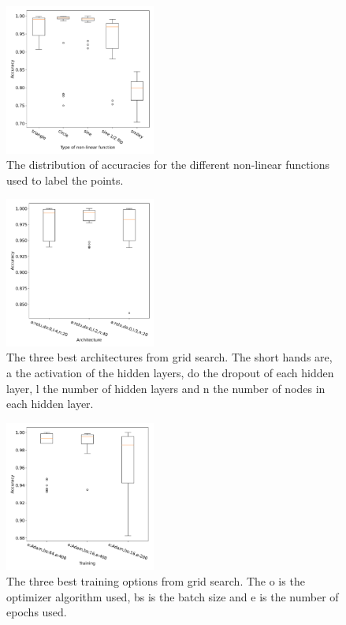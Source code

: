 \documentclass[prl,twocolumn]{revtex4-1}
\begin{document}
\begin{figure}[!tb]
  \includegraphics[width=0.44\textwidth]{task_1/figures/types_box_30.pdf}
  \caption{
  The distribution of accuracies for the different non-linear functions used to label the points. 
  }
  \label{fig:rescale_box}
\end{figure}

\begin{figure}[!tb]
  \includegraphics[width=0.44\textwidth]{task_1/figures/architecture_box_30.pdf}
  \caption{
  The three best architectures from grid search. The short hands are, a the activation of the hidden layers, do the dropout of each hidden layer, l the number of hidden layers and n the number of nodes in each hidden layer. 
  }
  \label{fig:architecture_gs_box}
\end{figure}

\begin{figure}[!tb]
  \includegraphics[width=0.44\textwidth]{task_1/figures/training_box_30.pdf}
  \caption{
  The three best training options from grid search. The o is the optimizer algorithm used, bs is the batch size and e is the number of epochs used. 
  }
  \label{fig:architecture_gs_box}
\end{figure}
\end{document}
